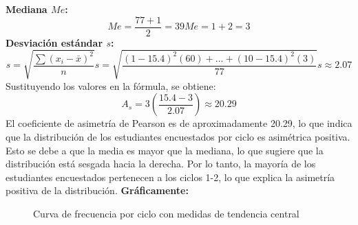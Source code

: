   \textbf{Mediana \(Me\):}
  \begin{equation*}
    Me = \frac{77 + 1}{2} = 39
    Me = 1+2 = 3
  \end{equation*}
  \textbf{Desviación estándar \(s\):}
  \begin{equation*}
    s = \sqrt{\frac{\sum (x_i - \bar{x})^2}{n}}
    s = \sqrt{\frac{(1-15.4)^2(60) + ... + (10-15.4)^2(3)}{77}}
    s \approx 2.07
  \end{equation*}
Sustituyendo los valores en la fórmula, se obtiene:
\begin{equation*}
  A_s = 3 \left( \frac{15.4 - 3}{2.07} \right) \approx 20.29
\end{equation*}
El coeficiente de asimetría de Pearson es de aproximadamente 20.29, lo que indica que la distribución de los estudiantes encuestados por ciclo es asimétrica positiva. Esto se debe a que la media es mayor que la mediana, lo que sugiere que la distribución está sesgada hacia la derecha. Por lo tanto, la mayoría de los estudiantes encuestados pertenecen a los ciclos 1-2, lo que explica la asimetría positiva de la distribución.
\textbf{Gráficamente:}
\begin{figure}[H]
	\centering
	\hspace*{-1.5cm}
	\caption{Curva de frecuencia por ciclo con medidas de tendencia central}
\end{figure}
